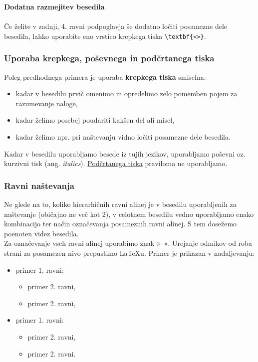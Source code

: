 \textbf{Dodatna razmejitev besedila}\\ \\
Če želite v zadnji, 4. ravni podpoglavja še dodatno ločiti posamezne dele besedila, lahko uporabite eno vrstico krepkega tiska \verb|\textbf{<>}|.

\subsubsection{Uporaba krepkega, poševnega in podčrtanega tiska}\label{sec:emphasis_types}

Poleg predhodnega primera je uporaba \textbf{krepkega tiska} smiselna:
\begin{itemize}
\item kadar v besedilu prvič omenimo in opredelimo zelo pomemben pojem za razumevanje naloge,
\item kadar želimo posebej poudariti kakšen del ali misel,
\item kadar želimo npr. pri naštevanju vidno ločiti posamezne dele besedila.
\end{itemize}

Kadar v besedilu uporabljamo besede iz tujih jezikov, uporabljamo poševni oz. kurzivni tisk (ang. \emph{italics}). \underline{Podčrtanega tiska} praviloma ne uporabljamo.


\subsubsection{Ravni naštevanja}\label{sec:itemizing}

Ne glede na to, koliko hierarhičnih ravni alinej je v besedilu uporabljenih za naštevanje (običajno ne več kot 2), v celotnem besedilu vedno uporabljamo enako kombinacijo ter način označevanja posameznih ravni alinej. S tem dosežemo poenoten videz besedila.\\

Za označevanje vseh ravni alinej uporabimo znak »--«. Urejanje odmikov od roba strani za posamezen nivo prepustimo \LaTeX u. Primer je prikazan v nadaljevanju:
\begin{itemize}
\item primer 1. ravni:
\begin{itemize}
\item primer 2. ravni,
\item primer 2. ravni,
\end{itemize}
\item primer 1. ravni:
\begin{itemize}
\item primer 2. ravni,
\item primer 2. ravni.
\end{itemize}
\end{itemize}

